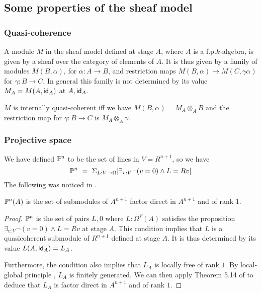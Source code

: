     \subsection{Some properties of the sheaf model}

    \subsubsection{Quasi-coherence}

A module $M$ in the sheaf model defined at stage $A$, where $A$ is a f.p.\@ $k$-algebra, is given by a sheaf over the category
of elements of $A$. It is thus given by a family of modules $M(B,\alpha)$, for $\alpha:A\rightarrow B$, and restriction maps
$M(B,\alpha)\rightarrow M(C,\gamma\alpha)$ for $\gamma:B\rightarrow C$. In general this family is not determined by
its value $M_A = M(A,\mathsf{id}_A)$ at $A,\mathsf{id}_A$.

\begin{proposition}
  $M$ is internally quasi-coherent iff we have $M(B,\alpha) = M_A\otimes_A B$ and the restriction map for
  $\gamma:B\rightarrow C$ is $M_A\otimes_A\gamma$.
\end{proposition}

    \subsubsection{Projective space}

We have defined $\mathbb{P}^n$ to be the set of lines in $V = R^{n+1}$, so we have
$$
\mathbb{P}^n ~=~ \Sigma_{L:V\rightarrow \Omega}[\exists_{v:V}\neg (v = 0)\wedge L = R v]
$$
The following was noticed in \cite{kockreyes}.

\begin{proposition}
  $\mathbb{P}^n(A)$ is the set of submodules of $A^{n+1}$ factor direct in $A^{n+1}$ and of rank $1$.
\end{proposition}

\begin{proof}
  $\mathbb{P}^n$ is the set of pairs $L,0$ where $L:\Omega^V(A)$ satisfies the proposition $\exists_{v:V}\neg (v = 0)\wedge L = Rv$ at stage
  $A$. This condition implies that $L$ is a quasicoherent submodule of $R^{n+1}$ defined at stage $A$.
  It is thus determined by its value $L(A,\mathsf{id}_A) = L_A$.

  Furthermore, the condition also implies that $L_A$ is locally free of rank $1$. By local-global principle \cite{lombardi-quitte},
  $L_A$ is finitely generated. We can then apply Theorem 5.14 of
  \cite{lombardi-quitte} to deduce that $L_A$ is factor direct in $A^{n+1}$ and of rank $1$.
\end{proof}

